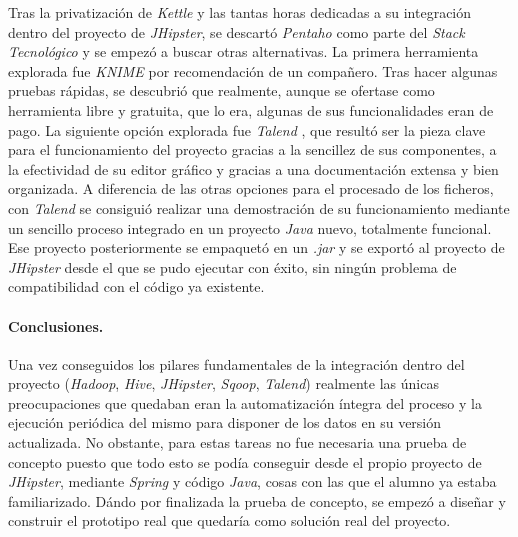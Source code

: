 \par
Tras la privatización de \textit{Kettle} y las tantas horas dedicadas a su integración dentro del proyecto de \textit{JHipster}, se descartó \textit{Pentaho} como parte del \textit{Stack Tecnológico} y se empezó a buscar otras alternativas. La primera herramienta explorada fue \textit{KNIME} \cite{knime} por recomendación de un compañero. Tras hacer algunas pruebas rápidas, se descubrió que realmente, aunque se ofertase como herramienta libre y gratuita, que lo era, algunas de sus funcionalidades eran de pago. La siguiente opción explorada fue \textit{Talend} \cite{talend}, que resultó ser la pieza clave para el funcionamiento del proyecto gracias a la sencillez de sus componentes, a la efectividad de su editor gráfico y gracias a una documentación extensa y bien organizada. A diferencia de las otras opciones para el procesado de los ficheros, con \textit{Talend} se consiguió realizar una demostración de su funcionamiento mediante un sencillo proceso integrado en un proyecto \textit{Java} nuevo, totalmente funcional. Ese proyecto posteriormente se empaquetó en un \textit{.jar} y se exportó al proyecto de \textit{JHipster} desde el que se pudo ejecutar con éxito, sin ningún problema de compatibilidad con el código ya existente.  


\bigskip
\par
\paragraph*{Conclusiones.}

\par
Una vez conseguidos los pilares fundamentales de la integración dentro del proyecto (\textit{Hadoop}, \textit{Hive}, \textit{JHipster}, \textit{Sqoop}, \textit{Talend}) realmente las únicas preocupaciones que quedaban eran la automatización íntegra del proceso y la ejecución periódica del mismo para disponer de los datos en su versión actualizada. No obstante, para estas tareas no fue necesaria una prueba de concepto puesto que todo esto se podía conseguir desde el propio proyecto de \textit{JHipster}, mediante \textit{Spring} y código \textit{Java}, cosas con las que el alumno ya estaba familiarizado. Dándo por finalizada la prueba de concepto, se empezó a diseñar y construir el prototipo real que quedaría como solución real del proyecto.


